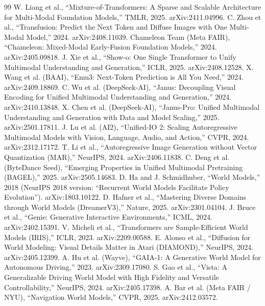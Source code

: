 \documentclass[10pt,conference]{IEEEtran}
\begin{document}
\begin{thebibliography}{99}
\footnotesize
{} W. Liang et al., ``Mixture-of-Transformers: A Sparse and Scalable
  Architecture for Multi-Modal Foundation Models,'' TMLR, 2025. arXiv:2411.04996.
 C. Zhou et al., ``Transfusion: Predict the Next Token and Diffuse
  Images with One Multi-Modal Model,'' 2024. arXiv:2408.11039.
 Chameleon Team (Meta FAIR), ``Chameleon: Mixed-Modal Early-Fusion
  Foundation Models,'' 2024. arXiv:2405.09818.
 J. Xie et al., ``Show-o: One Single Transformer to Unify
  Multimodal Understanding and Generation,'' ICLR, 2025. arXiv:2408.12528.
 X. Wang et al. (BAAI), ``Emu3: Next-Token Prediction is All You
  Need,'' 2024. arXiv:2409.18869.
 C. Wu et al. (DeepSeek-AI), ``Janus: Decoupling Visual Encoding for
  Unified Multimodal Understanding and Generation,'' 2024. arXiv:2410.13848.
 X. Chen et al. (DeepSeek-AI), ``Janus-Pro: Unified Multimodal
  Understanding and Generation with Data and Model Scaling,'' 2025. arXiv:2501.17811.
 J. Lu et al. (AI2), ``Unified-IO 2: Scaling Autoregressive
  Multimodal Models with Vision, Language, Audio, and Action,'' CVPR, 2024.
  arXiv:2312.17172.
 T. Li et al., ``Autoregressive Image Generation without Vector
  Quantization (MAR),'' NeurIPS, 2024. arXiv:2406.11838.
 C. Deng et al. (ByteDance Seed), ``Emerging Properties in Unified
  Multimodal Pretraining (BAGEL),'' 2025. arXiv:2505.14683.
 D. Ha and J. Schmidhuber, ``World Models,'' 2018 (NeurIPS 2018
  version: ``Recurrent World Models Facilitate Policy Evolution'').
  arXiv:1803.10122.
 D. Hafner et al., ``Mastering Diverse Domains through World Models
  (DreamerV3),'' Nature, 2025. arXiv:2301.04104.
 J. Bruce et al., ``Genie: Generative Interactive Environments,''
  ICML, 2024. arXiv:2402.15391.
 V. Micheli et al., ``Transformers are Sample-Efficient World
  Models (IRIS),'' ICLR, 2023. arXiv:2209.00588.
 E. Alonso et al., ``Diffusion for World Modeling: Visual Details
  Matter in Atari (DIAMOND),'' NeurIPS, 2024. arXiv:2405.12399.
 A. Hu et al. (Wayve), ``GAIA-1: A Generative World Model for
  Autonomous Driving,'' 2023. arXiv:2309.17080.
 S. Gao et al., ``Vista: A Generalizable Driving World Model with
  High Fidelity and Versatile Controllability,'' NeurIPS, 2024. arXiv:2405.17398.
 A. Bar et al. (Meta FAIR / NYU), ``Navigation World Models,''
  CVPR, 2025. arXiv:2412.03572.

\end{thebibliography}
\end{document}
